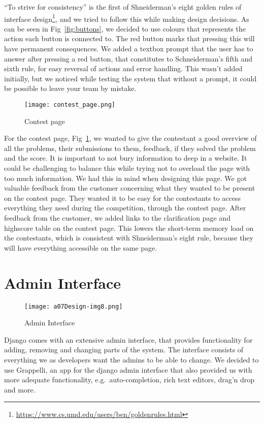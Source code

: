\pagebreak
``To strive for consistency'' is the
first of Shneiderman's eight golden rules of interface
design\footnote{\url{https://www.cs.umd.edu/users/ben/goldenrules.html}},
and we tried to follow this while making design decisions. As can be
seen in Fig~\ref{fig:buttons}, we decided to use colours that represents the action
each button is connected to. The red button marks that pressing this
will have permanent consequences. We added a textbox prompt that the
user has to answer after pressing a red button, that constitutes to
Schneiderman's fifth and sixth rule, for easy reversal
of actions and error handling. This wasn't added
initially, but we noticed while testing the system that without a
prompt, it could be possible to leave your team by mistake.
 
\begin{figure}[h!]
	\texttt{[image: contest\_page.png]} 
	\caption{Contest page}
	\label{fig:contestPage}
\end{figure}

For the contest page, Fig~\ref{fig:contestPage}, we wanted to give the contestant a good
overview of all the problems, their submissions to them, feedback,
if they solved the problem and the score. It is important to not bury
information to deep in a website. It could be challenging to balance
this while trying not to overload the page with too much information.
We had this in mind when designing this page. We got valuable feedback
from the customer concerning what they wanted to be present on the
contest page. They wanted it to be easy for the contestants to access
everything they need during the competition, through the contest page.
After feedback from the customer, we added links to the clarification
page and highscore table on the contest page. This lowers the
short-term memory load on the contestants, which is consistent with
Shneiderman's eight rule, because they will have
everything accessible on the same page.


\pagebreak
\section{Admin Interface}

 \begin{figure}[h!]
     \centering
	\texttt{[image: a07Design-img8.png]} 
	\caption{Admin Interface}
	\label{fig:adminInterface}
\end{figure}

Django comes with an
extensive admin interface, that provides functionality for adding,
removing and changing parts of the system. The interface consists
of everything we as developers want the admins to be able to change.
We decided to use
Grappelli, an app for the django admin interface that also provided us
with more adequate functionality, e.g.\ auto-completion, rich text
editors, drag'n drop and more.

